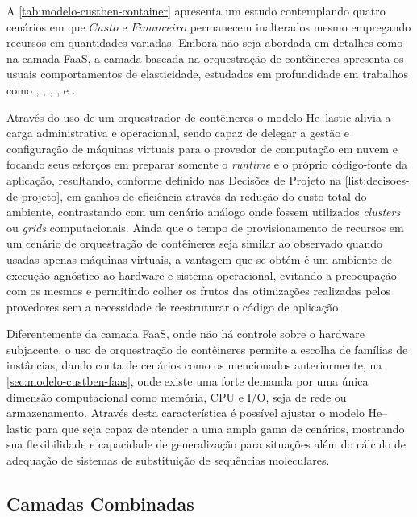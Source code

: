 \documentclass[english,brazilian]{UNISINOSmonografia} %
\begin{document}
A \autoref{tab:modelo-custben-container} apresenta um estudo contemplando quatro cenários em que $ Custo $ e $ Financeiro $ permanecem inalterados mesmo empregando recursos em quantidades variadas.
Embora não seja abordada em detalhes como na camada FaaS, a camada baseada na orquestração de contêineres apresenta os usuais comportamentos de elasticidade, estudados em profundidade em trabalhos como , , , ,  e .


Através do uso de um orquestrador de contêineres o modelo \textsf{He}--lastic alivia a carga administrativa e operacional, sendo capaz de delegar a gestão e configuração de máquinas virtuais para o provedor de computação em nuvem e focando seus esforços em preparar somente o \textit{runtime} e o próprio código-fonte da aplicação, resultando, conforme definido nas Decisões de Projeto na \autoref{list:decisoes-de-projeto}, em ganhos de eficiência através da redução do custo total do ambiente, contrastando com um cenário análogo onde fossem utilizados \textit{clusters} ou \textit{grids} computacionais.
Ainda que o tempo de provisionamento de recursos em um cenário de orquestração de contêineres seja similar ao observado quando usadas apenas máquinas virtuais, a vantagem que se obtém é um ambiente de execução agnóstico ao hardware e sistema operacional, evitando a preocupação com os mesmos e permitindo colher os frutos das otimizações realizadas pelos provedores sem a necessidade de reestruturar o código de aplicação.


Diferentemente da camada FaaS, onde não há controle sobre o hardware subjacente, o uso de orquestração de contêineres permite a escolha de famílias de instâncias, dando conta de cenários como os mencionados anteriormente, na \autoref{sec:modelo-custben-faas}, onde existe uma forte demanda por uma única dimensão computacional como memória, CPU e I/O, seja de rede ou armazenamento.
Através desta característica é possível ajustar o modelo \textsf{He}--lastic para que seja capaz de atender a uma ampla gama de cenários, mostrando sua flexibilidade e capacidade de generalização para situações além do cálculo de adequação de sistemas de substituição de sequências moleculares.






\subsection{Camadas Combinadas}
\end{document}
